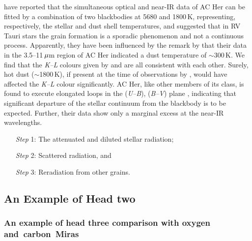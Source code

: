 \documentclass[useAMS,usenatbib, referree]{biom}
\begin{document}
\citet{b9} have reported that the simultaneous optical and near-IR
data of AC Her can be fitted by a combination of two blackbodies
at 5680 and 1800\,K, representing, respectively, the stellar and
dust shell temperatures, and suggested that in RV Tauri stars the
grain formation is a sporadic phenomenon and not a continuous
process. Apparently, they have been influenced by the remark by
\citet{b7} that their data in the 3.5--11$\,\mu$m region of AC
Her indicated a dust temperature of $\sim$300\,K. We find that the
{\it K--L\/} colours given by \citet{b5} and
\citet{b9} are all consistent with each other. Surely, hot dust
($\sim$1800\,K), if present at the time of observations by
\citet{b9}, would have affected the {\it K--L\/} colour
significantly. AC Her, like other members of its class, is found
to execute elongated loops in the ({\it U--B\/}), ({\it B--V\/})
plane \citep{b20}, indicating that significant departure of the
stellar continuum from the blackbody is to be expected. Further,
their data show only a marginal excess at the near-IR wavelengths.\vspace*{-4pt}
\begin{enumerate}
\item[{\it Step} 1:] The attenuated and diluted stellar radiation;
\item[{\it Step} 2:] Scattered radiation, and
\item[{\it Step} 3:] Reradiation from other grains.\vspace*{-8pt}
\end{enumerate}


\enlargethispage{-2pt}

\subsection{An Example of Head two}
\subsubsection{An example of head three comparison with oxygen and~carbon~Miras}
\end{document}

